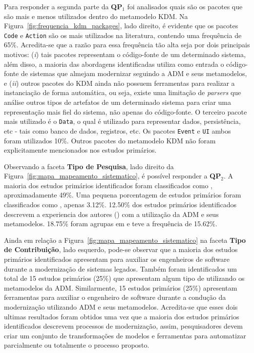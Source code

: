 Para responder a segunda parte da \textbf{QP$_1$} foi analisados quais são os pacotes que são mais e menos utilizados dentro do metamodelo KDM. Na Figura~\ref{fig:frequencia_kdm_packages}, lado direito, é evidente que os pacotes \texttt{Code} e \texttt{Action} são os mais utilizados na literatura, contendo uma frequência de 65\%. Acredita-se que a razão para essa frequência tão alta seja por dois principais motivos: (\textit{i}) tais pacotes representam o código-fonte de um determinado sistema, além disso, a maioria das abordagens identificadas utiliza como entrada o código-fonte de sistemas que almejam modernizar seguindo a ADM e seus metamodelos, e (\textit{ii}) outros pacotes do KDM ainda não possuem ferramentas para realizar a instanciação de forma automática, ou seja, existe uma limitação de \textit{parsers} que análise outros tipos de artefatos de um determinado sistema para criar uma representação mais fiel do sistema, não apenas do código-fonte. O terceiro pacote mais utilizado é o \texttt{Data}, o qual é utilizado para representar dados, persistência, etc - tais como banco de dados, registros, etc. Os pacotes \texttt{Event} e \texttt{UI} ambos foram utilizados 10\%. Outros pacotes do metamodelo KDM não foram explicitamente mencionados nos estudos primários.

Observando a faceta \textbf{Tipo de Pesquisa}, lado direito da Figura~\ref{fig:mapa_mapeamento_sistematico}, é possível responder a \textbf{QP$_2$}. A maioria dos estudos primários identificados foram classificados como , aproximadamente 49\%. Uma pequena porcentagem de estudos primários foram classificados como , apenas 3.12\%. 12.50\% dos estudos primários identificados descrevem a experiencia dos autores () com a utilização da ADM e seus metamodelos. 18.75\% foram agrupas em  e  teve a frequência de 15.62\%.

Ainda em relação a Figura~\ref{fig:mapa_mapeamento_sistematico} na faceta \textbf{Tipo de Contribuição}, lado esquerdo, pode-se observar que a maioria dos estudos primários identificados apresentam  para auxiliar os engenheiros de software durante a modernização de sistemas legados. Também foram identificados um total de 15 estudos primários (25\%) que apresentam algum tipo de  utilizando os metamodelos da ADM. Similarmente, 15 estudos primários (25\%) apresentam ferramentas para auxiliar o engenheiro de software durante a condução da modernização utilizando ADM e seus metamodelos. Acredita-se que esses dois ultimas resultados foram obtidos uma vez que a maioria dos estudos primários identificados descrevem processos de modernização, assim, pesquisadores devem criar um conjunto de transformações de modelos e ferramentas para automatizar parcialmente ou totalmente o processo proposto.

